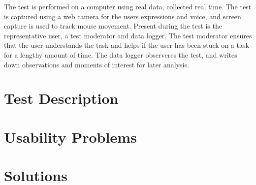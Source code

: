 The test is performed on a computer using real data, collected real time. The
test is captured using a web camera for the users expressions and voice, and
screen capture is used to track mouse movement. Present during the test is the
representative user, a test moderator and data logger. The test moderator
ensures that the user understands the task and helps if the user has been stuck
on a task for a lengthy amount of time. The data logger observeres the test,
and writes down observations and moments of interest for later analysis.

\section{Test Description}

\section{Usability Problems}

\section{Solutions}





















